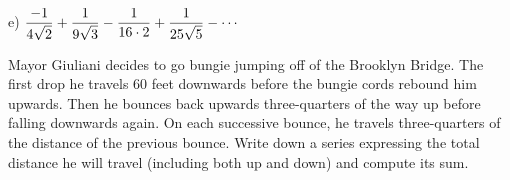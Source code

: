 \noindent e) $\displaystyle \frac{\displaystyle -1}{\displaystyle 4 \sqrt{2}} +
 \frac{\displaystyle 1}{\displaystyle 9 \sqrt{3}} -
\frac{\displaystyle 1}{\displaystyle 16 \cdot 2} +
\frac{\displaystyle 1}{\displaystyle 25 \sqrt {5}} -\cdots
 $ 
\vspace{1.3in}


\vspace{3.5in}
%

\newpage


\vspace{3.5in}

 \quest 
Mayor Giuliani decides to go bungie jumping off of the Brooklyn Bridge.
The first drop he travels 60 feet downwards before the
bungie cords rebound him upwards.  Then he bounces back
upwards three-quarters of the way up before falling downwards
again.  On each successive bounce, he travels three-quarters of
the distance of the previous bounce.
Write down a series expressing the total distance he will
travel (including both up and down) and compute its sum.
\quend


\vspace{4in}

%
%


